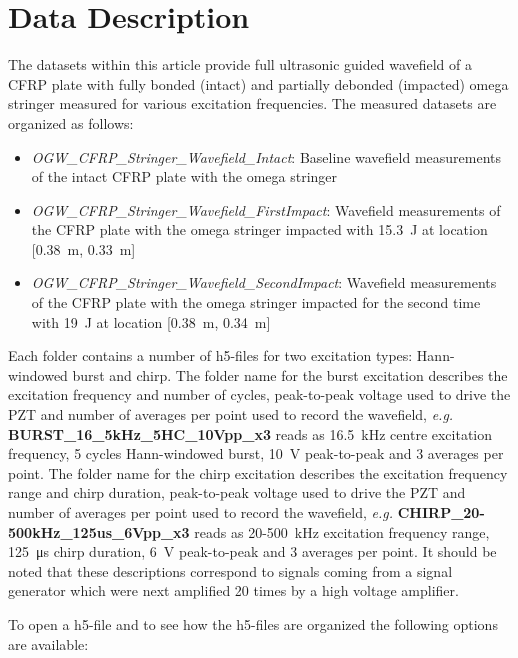 \documentclass[times,final]{elsarticle}
\begin{document}
\section{Data Description}
The datasets within this article provide full ultrasonic guided wavefield of a CFRP plate with fully bonded (intact) and partially debonded (impacted) omega stringer measured for various excitation frequencies. The measured datasets \cite{kudela_dataset_2021} are organized as follows:

\begin{itemize} 
\item \textit{OGW\_CFRP\_Stringer\_Wavefield\_Intact}: Baseline wavefield measurements of the intact CFRP plate with the omega stringer
\item \textit{OGW\_CFRP\_Stringer\_Wavefield\_FirstImpact}: Wavefield measurements of the CFRP plate with the omega stringer impacted with \SI{15.3}{\joule} at location [\SI{0.38}{\meter}, \SI{0.33}{\meter}]
\item \textit{OGW\_CFRP\_Stringer\_Wavefield\_SecondImpact}: Wavefield measurements of the CFRP plate with the omega stringer impacted for the second time with \SI{19}{\joule} at location [\SI{0.38}{\meter}, \SI{0.34}{\meter}]
\end{itemize}

Each folder contains a number of h5-files for two excitation types: Hann-windowed burst and chirp. The folder name for the burst excitation describes the excitation frequency and number of cycles, peak-to-peak voltage used to drive the PZT and number of averages per point used to record the wavefield, \textit{e.g.} \textbf{BURST\_16\_5kHz\_5HC\_10Vpp\_x3} reads as \SI{16.5}{\kilo\hertz} centre excitation frequency, \num{5} cycles Hann-windowed burst, \SI{10}{\volt} peak-to-peak and \num{3} averages per point. The folder name for the chirp excitation describes the excitation frequency range and chirp duration, peak-to-peak voltage used to drive the PZT and number of averages per point used to record the wavefield, \textit{e.g.} \textbf{CHIRP\_20-500kHz\_125us\_6Vpp\_x3} reads as \SI{20}{}-\SI{500}{\kilo\hertz} excitation frequency range, \SI{125}{\micro\second} chirp duration, \SI{6}{\volt} peak-to-peak and \num{3} averages per point. 
It should be noted that these descriptions correspond to signals coming from a signal generator which were next amplified 20 times by a high voltage amplifier.

To open a h5-file and to see how the h5-files are organized the following options are available:
\end{document}
